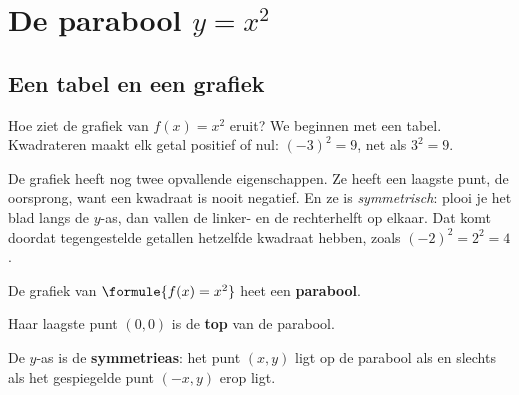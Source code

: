 \section{De parabool \texorpdfstring{$y = x^2$}{y = x²}}

\subsection{Een tabel en een grafiek}

Hoe ziet de grafiek van $f(x) = x^2$ eruit? We beginnen met een tabel. Kwadrateren maakt elk getal positief of nul: $(-3)^2 = 9$, net als $3^2 = 9$.



De grafiek heeft nog twee opvallende eigenschappen. Ze heeft een laagste punt, de oorsprong, want een kwadraat is nooit negatief. En ze is \textit{symmetrisch}: plooi je het blad langs de $y$-as, dan vallen de linker- en de rechterhelft op elkaar. Dat komt doordat tegengestelde getallen hetzelfde kwadraat hebben, zoals $(-2)^2 = 2^2 = 4$.

\begin{theorie}
De grafiek van $\formule{f(x) = x^2}$ heet een \textbf{\textcolor{accent}{parabool}}.

Haar laagste punt $(0, 0)$ is de \textbf{\textcolor{accent}{top}} van de parabool.

De $y$-as is de \textbf{\textcolor{accent}{symmetrieas}}: het punt $(x, y)$ ligt op de parabool als en slechts als het gespiegelde punt $(-x, y)$ erop ligt.
\end{theorie}

